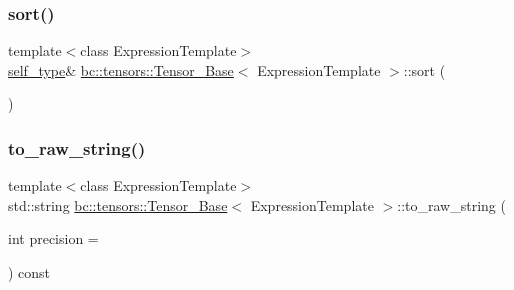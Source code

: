 \subsubsection{\texorpdfstring{sort()}{sort()}}
{\footnotesize\ttfamily template$<$class Expression\+Template$>$ \\
\hyperlink{classbc_1_1tensors_1_1Expression__Base}{self\+\_\+type}\& \hyperlink{classbc_1_1tensors_1_1Tensor__Base}{bc\+::tensors\+::\+Tensor\+\_\+\+Base}$<$ Expression\+Template $>$\+::sort (\begin{DoxyParamCaption}{ }\end{DoxyParamCaption})\hspace{0.3cm}{\ttfamily [inline]}}

\mbox{\label{classbc_1_1tensors_1_1Tensor__Base_a5545f38f28891235f7cf3595c8dcbb17}} 
\subsubsection{\texorpdfstring{to\+\_\+raw\+\_\+string()}{to\_raw\_string()}}
{\footnotesize\ttfamily template$<$class Expression\+Template$>$ \\
std\+::string \hyperlink{classbc_1_1tensors_1_1Tensor__Base}{bc\+::tensors\+::\+Tensor\+\_\+\+Base}$<$ Expression\+Template $>$\+::to\+\_\+raw\+\_\+string (\begin{DoxyParamCaption}\item[{int}]{precision = {} }\end{DoxyParamCaption}) const\hspace{0.3cm}{\ttfamily [inline]}}

\mbox{\label{classbc_1_1tensors_1_1Tensor__Base_ae7c9eff826ecb4b78bd4bc23020201b6}} 
